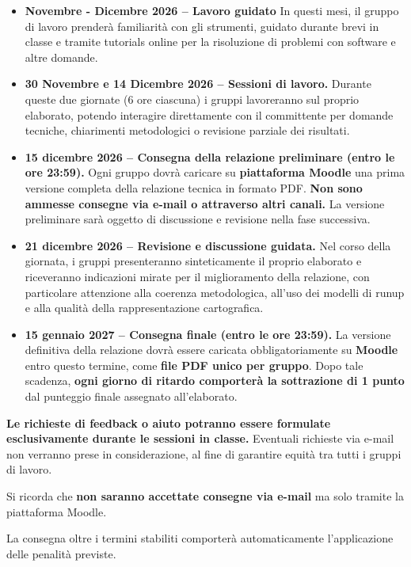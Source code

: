 \documentclass[11pt,a4paper,roman]{moderncv}
\begin{document}
\begin{itemize}
  \item \textbf{Novembre - Dicembre 2026 – Lavoro guidato}  
  In questi mesi, il gruppo di lavoro prenderà familiarità con gli strumenti, guidato durante brevi in classe e tramite tutorials online per la risoluzione di problemi con software e altre domande.   
  \item \textbf{30 Novembre e 14 Dicembre 2026 – Sessioni di lavoro.}  
  Durante queste due giornate (6 ore ciascuna) i gruppi lavoreranno sul proprio elaborato, potendo interagire direttamente con il committente per domande tecniche, chiarimenti metodologici o revisione parziale dei risultati.  
  \item \textbf{15 dicembre 2026 – Consegna della relazione preliminare (entro le ore 23:59).}  
  Ogni gruppo dovrà caricare su \textbf{piattaforma Moodle} una prima versione completa della relazione tecnica in formato PDF.  
  \textbf{Non sono ammesse consegne via e-mail o attraverso altri canali.}  
  La versione preliminare sarà oggetto di discussione e revisione nella fase successiva.

  \item \textbf{21 dicembre 2026 – Revisione e discussione guidata.}  
  Nel corso della giornata, i gruppi presenteranno sinteticamente il proprio elaborato e riceveranno indicazioni mirate per il miglioramento della relazione, con particolare attenzione alla coerenza metodologica, all’uso dei modelli di runup e alla qualità della rappresentazione cartografica.

  \item \textbf{15 gennaio 2027 – Consegna finale (entro le ore 23:59).}  
  La versione definitiva della relazione dovrà essere caricata obbligatoriamente su \textbf{Moodle} entro questo termine, come \textbf{file PDF unico per gruppo}.  
  Dopo tale scadenza, \textbf{ogni giorno di ritardo comporterà la sottrazione di 1 punto} dal punteggio finale assegnato all’elaborato.
\end{itemize}

\textbf{Le richieste di feedback o aiuto potranno essere formulate esclusivamente durante le sessioni in classe.}  Eventuali richieste via e-mail non verranno prese in considerazione, al fine di garantire equità tra tutti i gruppi di lavoro.

Si ricorda che \textbf{non saranno accettate consegne via e-mail} ma solo tramite la piattaforma Moodle.  

La consegna oltre i termini stabiliti comporterà automaticamente l’applicazione delle penalità previste.  
\end{document}
